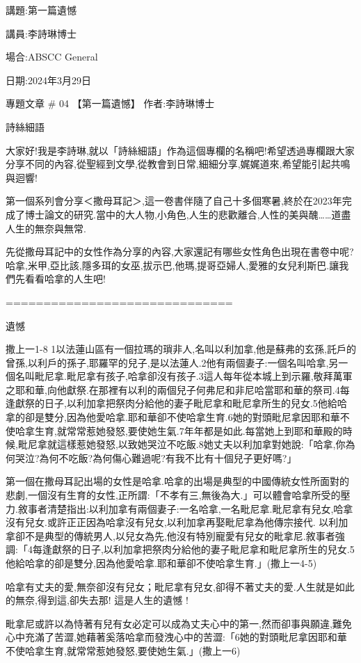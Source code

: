 \documentclass{book}
\begin{document}
講題:第一篇遺憾

講員:李詩琳博士

場合:ABSCC General

日期:2024年3月29日

專題文章 \# 04
【第一篇遺憾】
作者:李詩琳博士

詩絲細語

大家好!我是李詩琳,就以「詩絲細語」作為這個專欄的名稱吧!希望透過專欄跟大家分享不同的內容,從聖經到文學,從教會到日常,細細分享,娓娓道來,希望能引起共鳴與迴響!

第一個系列會分享＜撒母耳記＞,這一卷書伴隨了自己十多個寒暑,終於在2023年完成了博士論文的研究.當中的大人物,小角色,人生的悲歡離合,人性的美與醜……道盡人生的無奈與無常.

先從撒母耳記中的女性作為分享的內容,大家還記有哪些女性角色出現在書卷中呢?哈拿,米甲,亞比該,隱多珥的女巫,拔示巴,他瑪,提哥亞婦人,愛雅的女兒利斯巴.讓我們先看看哈拿的人生吧!

==============================

遺憾

撒上一1-8
1以法蓮山區有一個拉瑪的瑣非人,名叫以利加拿,他是蘇弗的玄孫,託戶的曾孫,以利戶的孫子,耶羅罕的兒子,是以法蓮人.2他有兩個妻子:一個名叫哈拿,另一個名叫毗尼拿.毗尼拿有孩子,哈拿卻沒有孩子.3這人每年從本城上到示羅,敬拜萬軍之耶和華,向他獻祭.在那裡有以利的兩個兒子何弗尼和非尼哈當耶和華的祭司.4每逢獻祭的日子,以利加拿把祭肉分給他的妻子毗尼拿和毗尼拿所生的兒女.5他給哈拿的卻是雙分,因為他愛哈拿.耶和華卻不使哈拿生育.6她的對頭毗尼拿因耶和華不使哈拿生育,就常常惹她發怒,要使她生氣.7年年都是如此.每當她上到耶和華殿的時候,毗尼拿就這樣惹她發怒,以致她哭泣不吃飯.8她丈夫以利加拿對她說:「哈拿,你為何哭泣?為何不吃飯?為何傷心難過呢?有我不比有十個兒子更好嗎?」

第一個在撒母耳記出場的女性是哈拿.哈拿的出場是典型的中國傳統女性所面對的悲劇,一個沒有生育的女性,正所謂:「不孝有三,無後為大.」可以體會哈拿所受的壓力.敘事者清楚指出:以利加拿有兩個妻子:一名哈拿,一名毗尼拿.毗尼拿有兒女,哈拿沒有兒女.或許正正因為哈拿沒有兒女,以利加拿再娶毗尼拿為他傳宗接代.
以利加拿卻不是典型的傳統男人,以兒女為先,他沒有特別寵愛有兒女的毗拿尼.敘事者強調:「4每逢獻祭的日子,以利加拿把祭肉分給他的妻子毗尼拿和毗尼拿所生的兒女.5他給哈拿的卻是雙分,因為他愛哈拿.耶和華卻不使哈拿生育.」(撒上一4-5)

哈拿有丈夫的愛,無奈卻沒有兒女；毗尼拿有兒女,卻得不著丈夫的愛.人生就是如此的無奈,得到這,卻失去那! 這是人生的遺憾 !

毗拿尼或許以為恃著有兒有女必定可以成為丈夫心中的第一,然而卻事與願違,難免心中充滿了苦澀,她藉著奚落哈拿而發洩心中的苦澀:「6她的對頭毗尼拿因耶和華不使哈拿生育,就常常惹她發怒,要使她生氣.」(撒上一6)
\end{document}
